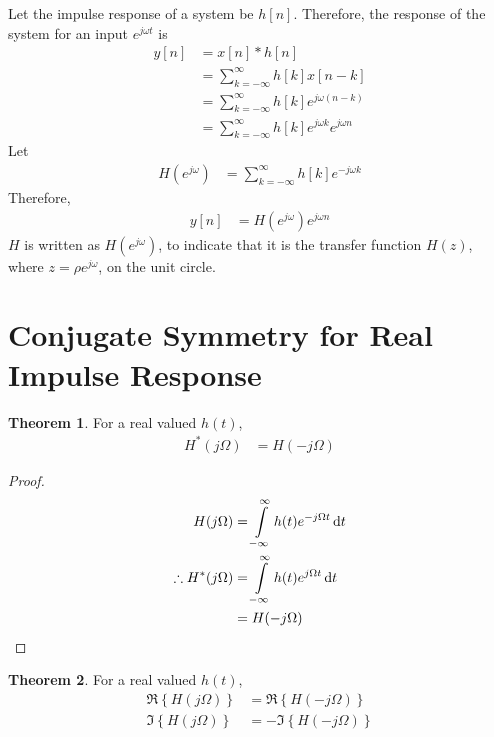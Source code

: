 \documentclass[titlepage, fleqn, a4paper, 12pt, twoside]{article}
\theoremstyle{definition}
\theoremstyle{theorem}
\newtheorem{theorem}{Theorem}
\begin{document}
Let the impulse response of a system be $h[n]$.
Therefore, the response of the system for an input $e^{j \omega t}$ is
\begin{align*}
	y[n] &= x[n] \ast h[n]\\
	&= \sum\limits_{k = -\infty}^{\infty} h[k] x[n - k]\\
	&= \sum\limits_{k = -\infty}^{\infty} h[k] e^{j \omega (n - k)}\\
	&= \sum\limits_{k = -\infty}^{\infty} h[k] e^{j \omega k} e^{j \omega n}
\end{align*}
Let
\begin{align*}
	H\left( e^{j \omega} \right) &= \sum\limits_{k = -\infty}^{\infty} h[k] e^{-j \omega k}
\end{align*}
Therefore,
\begin{align*}
	y[n] &= H\left( e^{j \omega} \right) e^{j \omega n}
\end{align*}
$H$ is written as $H\left( e^{j \omega} \right)$, to indicate that it is the transfer function $H(z)$, where $z = \rho e^{j \omega}$, on the unit circle.

\section{Conjugate Symmetry for Real Impulse Response}

\begin{theorem}
	For a real valued $h(t)$,
	\begin{align*}
		H^*(j \Omega) &= H(-j \Omega)
	\end{align*}
\end{theorem}

\begin{proof}
	\begin{align*}
		H(j \Omega) &= \int\limits_{-\infty}^{\infty} h(t) e^{-j \Omega t} \dif t\\
		\therefore H^*(j \Omega) &= \int\limits_{-\infty}^{\infty} h(t) e^{j \Omega t} \dif t\\
		&= H(-j \Omega)
	\end{align*}
\end{proof}

\begin{theorem}
	For a real valued $h(t)$,
	\begin{align*}
		\Re\left\{ H(j \Omega) \right\} &= \Re\left\{ H(-j \Omega) \right\}\\
		\Im\left\{ H(j \Omega) \right\} &= -\Im\left\{ H(-j \Omega) \right\}
	\end{align*}
\end{theorem}
\end{document}
